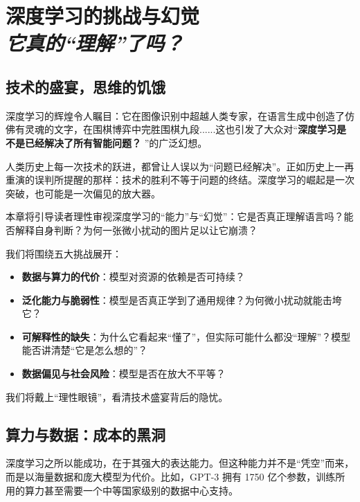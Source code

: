 \chapter{ 深度学习的挑战与幻觉\\\textit{它真的“理解”了吗？}}

\section*{技术的盛宴，思维的饥饿}

深度学习的辉煌令人瞩目：它在图像识别中超越人类专家，在语言生成中创造了仿佛有灵魂的文字，在围棋博弈中完胜围棋九段......这也引发了大众对“\textbf{深度学习是不是已经解决了所有智能问题？} ”的广泛幻想。


人类历史上每一次技术的跃进，都曾让人误以为“问题已经解决”。正如历史上一再重演的误判所提醒的那样：技术的胜利不等于问题的终结。深度学习的崛起是一次突破，也可能是一次偏见的放大器。

本章将引导读者理性审视深度学习的“能力”与“幻觉”：它是否真正理解语言吗？能否解释自身判断？为何一张微小扰动的图片足以让它崩溃？

我们将围绕五大挑战展开：

\begin{itemize}
\item  \textbf{数据与算力的代价}：模型对资源的依赖是否可持续？
\item   \textbf{泛化能力与脆弱性}：模型是否真正学到了通用规律？为何微小扰动就能击垮它？ 
\item   \textbf{可解释性的缺失}：为什么它看起来“懂了”，但实际可能什么都没“理解”？模型能否讲清楚“它是怎么想的”？
\item  \textbf{数据偏见与社会风险}：模型是否在放大不平等？
\end{itemize}

我们将戴上“理性眼镜”，看清技术盛宴背后的隐忧。

\section*{算力与数据：成本的黑洞}
深度学习之所以能成功，在于其强大的表达能力。但这种能力并不是“凭空”而来，而是以海量数据和庞大模型为代价。比如，GPT-3 拥有 1750 亿个参数，训练所用的算力甚至需要一个中等国家级别的数据中心支持。

